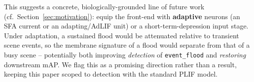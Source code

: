 This suggests a concrete, biologically-grounded line of future work
(cf.\ Section~\ref{sec:motivation}): equip the front-end with \textbf{adaptive} neurons
(an SFA current or an adapting/AdLIF unit) or a short-term-depression input stage. Under
adaptation, a sustained flood would be attenuated relative to transient scene events, so the
membrane signature of a flood would separate from that of a busy scene -- potentially both
improving \emph{detection} of \texttt{event\_flood} and \emph{restoring} downstream mAP. We
flag this as a promising direction rather than a result, keeping this paper scoped to
detection with the standard PLIF model.

